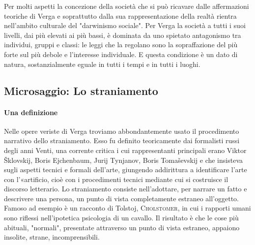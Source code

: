 \documentclass{book}
\begin{document}
Per molti aspetti la concezione della società che si può ricavare dalle affermazioni teoriche di Verga e soprattutto dalla sua rappresentazione della realtà rientra nell'ambito culturale del "darwinismo sociale". Per Verga la società a tutti i suoi livelli, dai più elevati ai più bassi, è dominata da uno spietato antagonismo tra individui, gruppi e classi: le leggi che la regolano sono la sopraffazione del più forte sul più debole e l'interesse individuale. E questa condizione è un dato di natura, sostanzialmente eguale in tutti i tempi e in tutti i luoghi.

\subsection{Microsaggio: Lo straniamento}

\paragraph{Una definizione} Nelle opere veriste di Verga troviamo abbondantemente usato il procedimento narrativo dello straniamento. Esso fu definito teoricamente dai formalisti russi degli anni Venti, una corrente 
critica i cui rappresentanti principali erano Viktor Šklovskij, Boris Ejchenbaum, Jurij Tynjanov, Boris Tomaševskij e che insisteva sugli aspetti tecnici e formali dell'arte, giungendo addirittura a identificare l'arte con l'«artificio, cioè con i procedimenti tecnici mediante cui si costruisce il discorso letterario. Lo straniamento consiste nell'adottare, per narrare un fatto e descrivere una persona, un punto di vista completamente estraneo all'oggetto. Famoso ad esempio è un racconto di Tolstoj, \textsc{Cholstomer}, in cui i rapporti umani sono riflessi nell'ipotetica psicologia di un cavallo. Il risultato è che le cose più abituali, "normali", presentate attraverso un punto di vista estraneo, appaiono insolite, strane, incomprensibili.
\end{document}
